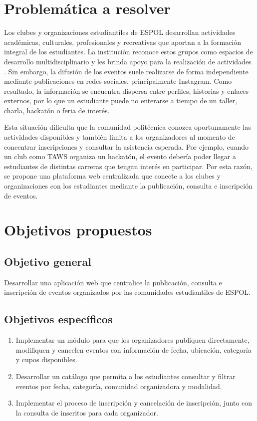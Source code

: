 \documentclass[12pt]{article}
\begin{document}
\tableofcontents
\newpage

\section{Problemática a resolver}

Los clubes y organizaciones estudiantiles de ESPOL desarrollan actividades académicas, culturales, profesionales y recreativas que aportan a la formación integral de los estudiantes. La institución reconoce estos grupos como espacios de desarrollo multidisciplinario y les brinda apoyo para la realización de actividades \cite{espolclubes,programaclubes}. Sin embargo, la difusión de los eventos suele realizarse de forma independiente mediante publicaciones en redes sociales, principalmente Instagram. Como resultado, la información se encuentra dispersa entre perfiles, historias y enlaces externos, por lo que un estudiante puede no enterarse a tiempo de un taller, charla, hackatón o feria de interés.

Esta situación dificulta que la comunidad politécnica conozca oportunamente las actividades disponibles y también limita a los organizadores al momento de concentrar inscripciones y consultar la asistencia esperada. Por ejemplo, cuando un club como TAWS organiza un hackatón, el evento debería poder llegar a estudiantes de distintas carreras que tengan interés en participar. Por esta razón, se propone una plataforma web centralizada que conecte a los clubes y organizaciones con los estudiantes mediante la publicación, consulta e inscripción de eventos.

\section{Objetivos propuestos}

\subsection{Objetivo general}

Desarrollar una aplicación web que centralice la publicación, consulta e inscripción de eventos organizados por las comunidades estudiantiles de ESPOL.

\subsection{Objetivos específicos}

\begin{enumerate}
    \item Implementar un módulo para que los organizadores publiquen directamente, modifiquen y cancelen eventos con información de fecha, ubicación, categoría y cupos disponibles.
    \item Desarrollar un catálogo que permita a los estudiantes consultar y filtrar eventos por fecha, categoría, comunidad organizadora y modalidad.
    \item Implementar el proceso de inscripción y cancelación de inscripción, junto con la consulta de inscritos para cada organizador.
\end{enumerate}
\end{document}
